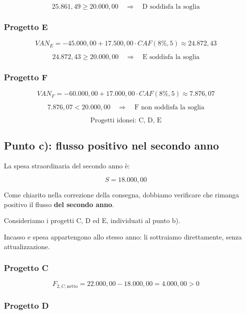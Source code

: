 \[
    25.861{,}49\geq20.000{,}00
    \quad\Rightarrow\quad
    \text{D soddisfa la soglia}
\]

\subsubsection*{Progetto E}

\[
    VAN_E
    =
    -45.000{,}00+
    17.500{,}00\cdot CAF(8\%,5)
    \approx 24.872{,}43
\]

\[
    24.872{,}43\geq20.000{,}00
    \quad\Rightarrow\quad
    \text{E soddisfa la soglia}
\]

\subsubsection*{Progetto F}

\[
    VAN_F
    =
    -60.000{,}00+
    17.000{,}00\cdot CAF(8\%,5)
    \approx 7.876{,}07
\]

\[
    7.876{,}07<20.000{,}00
    \quad\Rightarrow\quad
    \text{F non soddisfa la soglia}
\]

\[
    \boxed{\text{Progetti idonei: C, D, E}}
\]

\subsection{Punto c): flusso positivo nel secondo anno}

\noindent La spesa straordinaria del secondo anno è:

\[
    S=18.000{,}00
\]

\noindent Come chiarito nella correzione della consegna, dobbiamo
verificare che rimanga positivo il flusso
\textbf{del secondo anno}.

\noindent Consideriamo i progetti C, D ed E, individuati al punto b).

\noindent Incasso e spesa appartengono allo stesso anno:
li sottraiamo direttamente, senza attualizzazione.

\subsubsection*{Progetto C}

\[
    F_{2,C,\text{netto}}
    =
    22.000{,}00-18.000{,}00
    =
    4.000{,}00>0
\]

\subsubsection*{Progetto D}

